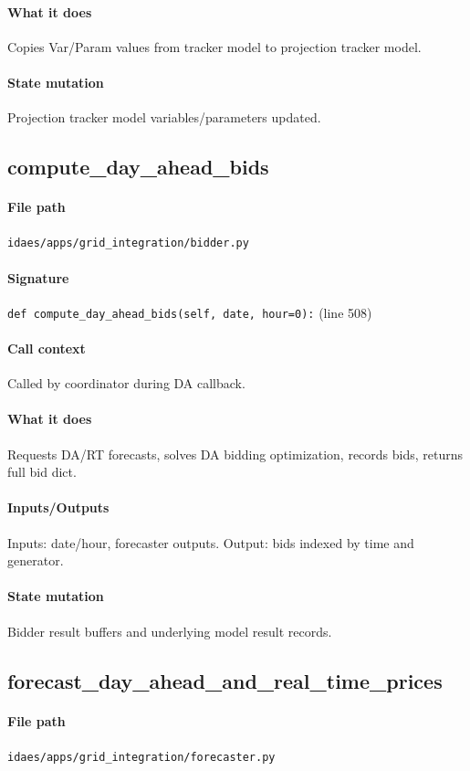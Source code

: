 \documentclass{article}
\begin{document}
\paragraph{What it does} Copies Var/Param values from tracker model to projection tracker model.
\paragraph{State mutation} Projection tracker model variables/parameters updated.

\subsection{compute\_day\_ahead\_bids}\label{fn:compute_day_ahead_bids}
\paragraph{File path} \texttt{idaes/apps/grid\_integration/bidder.py}
\paragraph{Signature} \texttt{def compute\_day\_ahead\_bids(self, date, hour=0):} (line 508)
\paragraph{Call context} Called by coordinator during DA callback.
\paragraph{What it does} Requests DA/RT forecasts, solves DA bidding optimization, records bids, returns full bid dict.
\paragraph{Inputs/Outputs} Inputs: date/hour, forecaster outputs. Output: bids indexed by time and generator.
\paragraph{State mutation} Bidder result buffers and underlying model result records.

\subsection{forecast\_day\_ahead\_and\_real\_time\_prices}\label{fn:forecast_day_ahead_and_real_time_prices}
\paragraph{File path} \texttt{idaes/apps/grid\_integration/forecaster.py}
\end{document}
